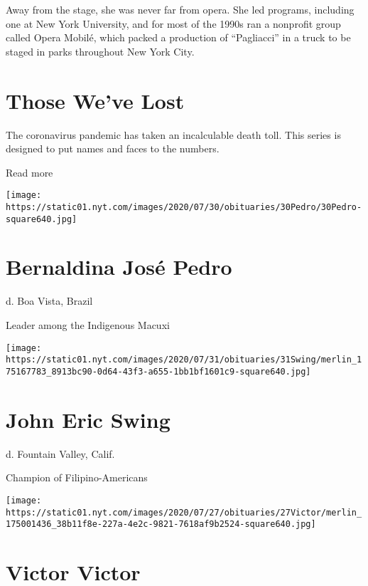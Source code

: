 Away from the stage, she was never far from opera. She led programs,
including one at New York University, and for most of the 1990s ran a
nonprofit group called Opera Mobilé, which packed a production of
``Pagliacci'' in a truck to be staged in parks throughout New York City.

\href{https://www.nytimes.com/interactive/2020/obituaries/people-died-coronavirus-obituaries.html?action=click\&pgtype=Article\&state=default\&region=BELOW_MAIN_CONTENT\&context=covid_obits_promo}{}

\hypertarget{those-weve-lost}{%
\section{Those We've Lost}\label{those-weve-lost}}

The coronavirus pandemic has taken an incalculable death toll. This
series is designed to put names and faces to the numbers.

Read more

\texttt{[image: https://static01.nyt.com/images/2020/07/30/obituaries/30Pedro/30Pedro-square640.jpg]}

\hypertarget{bernaldina-josuxe9-pedro}{%
\section{Bernaldina José Pedro}\label{bernaldina-josuxe9-pedro}}

d. Boa Vista, Brazil

Leader among the Indigenous Macuxi

\texttt{[image: https://static01.nyt.com/images/2020/07/31/obituaries/31Swing/merlin\_175167783\_8913bc90-0d64-43f3-a655-1bb1bf1601c9-square640.jpg]}

\hypertarget{john-eric-swing}{%
\section{John Eric Swing}\label{john-eric-swing}}

d. Fountain Valley, Calif.

Champion of Filipino-Americans

\texttt{[image: https://static01.nyt.com/images/2020/07/27/obituaries/27Victor/merlin\_175001436\_38b11f8e-227a-4e2c-9821-7618af9b2524-square640.jpg]}

\hypertarget{victor-victor}{%
\section{Victor Victor}\label{victor-victor}}


